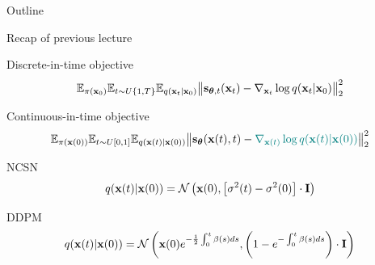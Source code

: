 

\usepackage{tikz}

\usetikzlibrary{arrows,shapes,positioning,shadows,trees}

\begin{frame}
\titlepage
\end{frame}
\begin{frame}{Outline}
	\tableofcontents
\end{frame}
\begin{frame}{Recap of previous lecture}
	\begin{block}{Discrete-in-time objective}
		\vspace{-0.3cm}
		\[
			\mathbb{E}_{\pi(\mathbf{x}_0)} \mathbb{E}_{t \sim U\{1, T\}} \mathbb{E}_{q(\mathbf{x}_t | \mathbf{x}_0)}\bigl\| \mathbf{s}_{\boldsymbol{\theta}, t}(\mathbf{x}_t) - \nabla_{\mathbf{x}_t} \log q(\mathbf{x}_t | \mathbf{x}_0) \bigr\|^2_2 
		\]
		\vspace{-0.5cm}
	\end{block}
	\begin{block}{Continuous-in-time objective}
		\vspace{-0.5cm}
		\[
			\mathbb{E}_{\pi(\mathbf{x}(0))} \mathbb{E}_{t \sim U[0, 1]} \mathbb{E}_{q(\mathbf{x}(t) | \mathbf{x}(0))}\bigl\| \mathbf{s}_{\boldsymbol{\theta}}(\mathbf{x}(t), t) - {\color{teal}\nabla_{\mathbf{x}(t)} \log q(\mathbf{x}(t) | \mathbf{x}(0))} \bigr\|^2_2 
		\]
		\vspace{-0.5cm}
	\end{block}
	\begin{block}{NCSN}
		\vspace{-0.3cm}
		\[
			q(\mathbf{x}(t) | \mathbf{x}(0)) = \mathcal{N}\left(\mathbf{x}(0), \left[\sigma^2(t) - \sigma^2(0)\right] \cdot \mathbf{I}\right)
		\]
		\vspace{-0.5cm}
	\end{block}
	\begin{block}{DDPM}
		\vspace{-0.3cm}
		\[
			q(\mathbf{x}(t) | \mathbf{x}(0)) = \mathcal{N}\left(\mathbf{x}(0) e^{-\frac{1}{2} \int_0^t\beta(s)ds}, \left(1 - e^{- \int_0^t\beta(s)ds}\right) \cdot \mathbf{I}\right)
		\]
		\vspace{-0.5cm}
	\end{block}
	
\end{frame}
